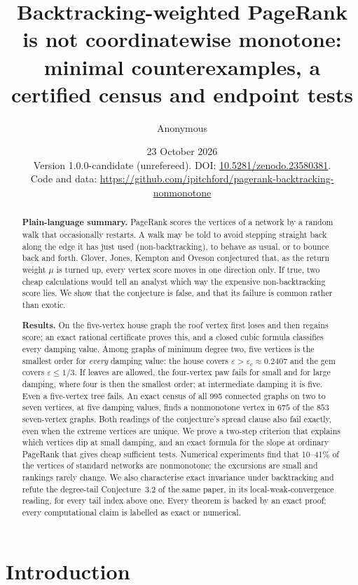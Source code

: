 \documentclass[11pt,a4paper]{article}
\title{Backtracking-weighted PageRank is not coordinatewise monotone:\\
minimal counterexamples, a certified census and endpoint tests}
\author{Anonymous}
\date{23 October 2026\\[2pt]\small Version 1.0.0-candidate (unrefereed). DOI: \href{https://doi.org/10.5281/zenodo.23580381}{10.5281/zenodo.23580381}.\\
\small Code and data: \url{https://github.com/ipitchford/pagerank-backtracking-nonmonotone}}
\theoremstyle{definition}\newtheorem{conjecture}{Conjecture}
\theoremstyle{remark}\newtheorem{remark}[theorem]{Remark}
\newcommand{\eps}{\varepsilon}
\begin{document}
\maketitle

\begin{abstract}
\noindent\textbf{Plain-language summary.}
PageRank scores the vertices of a network by a random walk that occasionally restarts. A walk may be told to avoid stepping straight back along the edge it has just used (non-backtracking), to behave as usual, or to bounce back and forth. Glover, Jones, Kempton and Oveson conjectured that, as the return weight $\mu$ is turned up, every vertex score moves in one direction only. If true, two cheap calculations would tell an analyst which way the expensive non-backtracking score lies. We show that the conjecture is false, and that its failure is common rather than exotic.

\smallskip\noindent\textbf{Results.}
On the five-vertex house graph the roof vertex first loses and then regains score; an exact rational certificate proves this, and a closed cubic formula classifies every damping value. Among graphs of minimum degree two, five vertices is the smallest order for \emph{every} damping value: the house covers $\eps>\eps_c\approx0.2407$ and the gem covers $\eps\leq1/3$. If leaves are allowed, the four-vertex paw fails for small and for large damping, where four is then the smallest order; at intermediate damping it is five. Even a five-vertex tree fails. An exact census of all 995 connected graphs on two to seven vertices, at five damping values, finds a nonmonotone vertex in $675$ of the $853$ seven-vertex graphs. Both readings of the conjecture's spread clause also fail exactly, even when the extreme vertices are unique. We prove a two-step criterion that explains which vertices dip at small damping, and an exact formula for the slope at ordinary PageRank that gives cheap sufficient tests. Numerical experiments find that 10--41\% of the vertices of standard networks are nonmonotone; the excursions are small and rankings rarely change. We also characterise exact invariance under backtracking and refute the degree-tail Conjecture~3.2 of the same paper, in its local-weak-convergence reading, for every tail index above one. Every theorem is backed by an exact proof; every computational claim is labelled as exact or numerical.
\end{abstract}

\tableofcontents

\section{Introduction}
\end{document}
